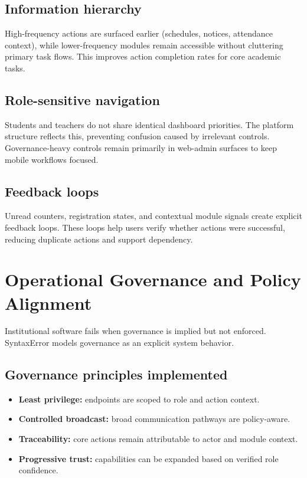 \documentclass[conference]{IEEEtran}
\begin{document}
\subsection{Information hierarchy}
High-frequency actions are surfaced earlier (schedules, notices, attendance context), while lower-frequency modules remain accessible without cluttering primary task flows. This improves action completion rates for core academic tasks.

\subsection{Role-sensitive navigation}
Students and teachers do not share identical dashboard priorities. The platform structure reflects this, preventing confusion caused by irrelevant controls. Governance-heavy controls remain primarily in web-admin surfaces to keep mobile workflows focused.

\subsection{Feedback loops}
Unread counters, registration states, and contextual module signals create explicit feedback loops. These loops help users verify whether actions were successful, reducing duplicate actions and support dependency.

\section{Operational Governance and Policy Alignment}
Institutional software fails when governance is implied but not enforced. SyntaxError models governance as an explicit system behavior.

\subsection{Governance principles implemented}
\begin{itemize}
    \item \textbf{Least privilege:} endpoints are scoped to role and action context.
    \item \textbf{Controlled broadcast:} broad communication pathways are policy-aware.
    \item \textbf{Traceability:} core actions remain attributable to actor and module context.
    \item \textbf{Progressive trust:} capabilities can be expanded based on verified role confidence.
\end{itemize}
\end{document}
